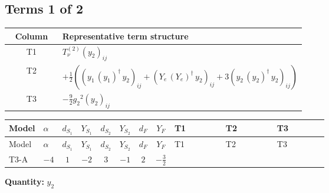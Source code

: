 \documentclass[8pt]{article}
\begin{document}
\begin{landscape}
\subsection*{Terms 1 of 2}
\begin{center}
\begin{tabular}{@{}c >{\raggedright\arraybackslash}p{0.82\linewidth}@{}}
\toprule
Column & Representative term structure \\
\midrule
T1 & \(\displaystyle T_{\nu}^{(2)} \left({y_2}\right)_{ij}\) \\
\midrule
T2 & \(\displaystyle +\frac{1}{2} (\left({y_1}\,\left({y_1}\right)^{\dagger}\,{y_2}\right)_{ij}+\left({Y_e}\,\left({Y_e}\right)^{\dagger}\,{y_2}\right)_{ij}+3 \left({y_2}\,\left({y_2}\right)^{\dagger}\,{y_2}\right)_{ij})\) \\
\midrule
T3 & \(\displaystyle -\frac{9}{2} {g_2}^2 \left({y_2}\right)_{ij}\) \\
\midrule
\bottomrule
\end{tabular}
\end{center}
\smallskip
\tiny
\begin{longtable}{@{}llcccccc >{\raggedright\arraybackslash}p{0.21\linewidth} >{\raggedright\arraybackslash}p{0.21\linewidth} >{\raggedright\arraybackslash}p{0.21\linewidth}@{}}
\toprule
Model & $\alpha$ & $d_{S_1}$ & $Y_{S_1}$ & $d_{S_2}$ & $Y_{S_2}$ & $d_F$ & $Y_F$ & T1 & T2 & T3 \\
\midrule
\endfirsthead
\toprule
Model & $\alpha$ & $d_{S_1}$ & $Y_{S_1}$ & $d_{S_2}$ & $Y_{S_2}$ & $d_F$ & $Y_F$ & T1 & T2 & T3 \\
\midrule
\endhead
T3-A & $-4$ & $1$ & $-2$ & $3$ & $-1$ & $2$ & $-\frac{3}{2}$ & \scriptsize\adjustbox{max width=\linewidth}{$\begin{gathered} T_{\nu}^{(2)} \left({y_2}\right)_{ij}\end{gathered}$} & \scriptsize\adjustbox{max width=\linewidth}{$\begin{gathered} +\frac{1}{2} (\left({y_1}\,\left({y_1}\right)^{\dagger}\,{y_2}\right)_{ij}+\left({Y_e}\,\left({Y_e}\right)^{\dagger}\,{y_2}\right)_{ij}+3 \left({y_2}\,\left({y_2}\right)^{\dagger}\,{y_2}\right)_{ij})\end{gathered}$} & \scriptsize\adjustbox{max width=\linewidth}{$\begin{gathered} -\frac{9}{2} {g_2}^2 \left({y_2}\right)_{ij}\end{gathered}$} \\
\midrule
\bottomrule
\end{longtable}
\clearpage
\noindent\textbf{Quantity: }$y_2$\par\smallskip

\end{landscape}
\end{document}
